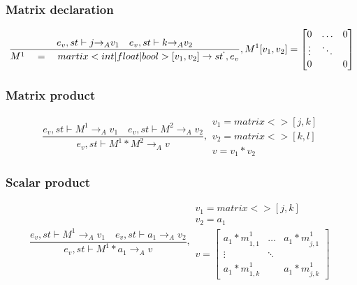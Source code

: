 \subsubsection{Matrix declaration}
\begin{equation}
	\frac { { e }_{ v },st\vdash j{ \rightarrow  }_{ A }{ v }_{ 1 }\quad { e }_{ v },st\vdash k{ \rightarrow  }_{ A }{ v }_{ 2 } }{ { M }^{ 1 }\quad =\quad martix<int|float|bool>[{ v }_{ 1 },{ v }_{ 2 }]\rightarrow { st }^{ ` },{ e }_{ v } } ,{ M }^{ 1 }[{ v }_{ 1 },{ v }_{ 2 }]=\begin{bmatrix} { 0 } & \dots  & 0 \\ \vdots  & \ddots  &  \\ 0 &  & 0 \end{bmatrix}
	\end{equation}

\subsubsection{Matrix product}
\begin{equation}
	\frac { { e }_{ v },st\vdash { M }^{ 1 }{ \rightarrow  }_{ A }{ v }_{ 1 }\quad { e }_{ v },st\vdash { M }^{ 2 }{ \rightarrow  }_{ A }{ v }_{ 2 } }{ { e }_{ v },st\vdash { M }^{ 1 }*{ M }^{ 2 }{ \rightarrow  }_{ A }{ v } } ,\begin{matrix} { v }_{ 1 }=matrix<>[j,k] \\ { v }_{ 2 }=matrix<>[k,l] \\ v={ v }_{ 1 }*{ v }_{ 2 } \end{matrix}
\end{equation}

\subsubsection{Scalar product}
\begin{equation}
	\frac { { e }_{ v },st\vdash { M }^{ 1 }{ \rightarrow  }_{ A }{ v }_{ 1 }\quad { e }_{ v },st\vdash { a }_{ 1 }{ \rightarrow  }_{ A }{ v }_{ 2 } }{ { e }_{ v },st\vdash { M }^{ 1 }\ast { a }_{ 1 }{ \rightarrow  }_{ A }{ v } } ,\begin{matrix} { v }_{ 1 }=matrix<>[j,k] \\ { v }_{ 2 }={ a }_{ 1 } \\ v=\begin{bmatrix} { { a }_{ 1 }*m }_{ 1,1 }^{ 1 } & \dots  & { { a }_{ 1 }*m }_{ j,1 }^{ 1 } \\ \vdots  & \ddots  &  \\ { { a }_{ 1 }*m }_{ 1,k }^{ 1 } &  & { { a }_{ 1 }*m }_{ j,k }^{ 1 } \end{bmatrix} \end{matrix}
\end{equation}

